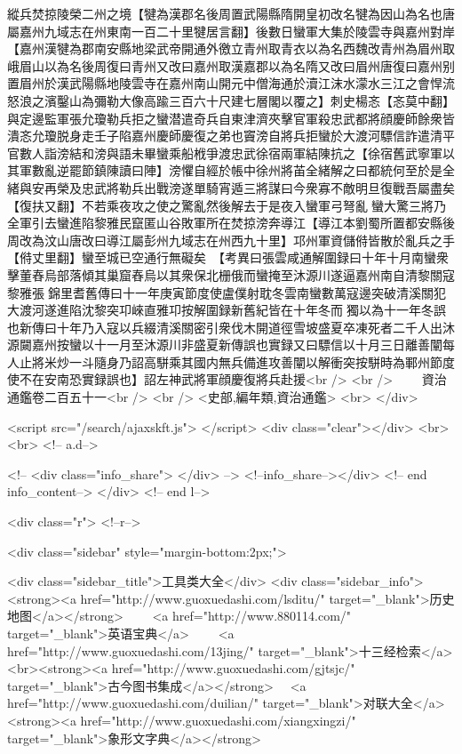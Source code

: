 縱兵焚掠陵榮二州之境【犍為漢郡名後周置武陽縣隋開皇初改名犍為因山為名也唐屬嘉州九域志在州東南一百二十里犍居言翻】後數日蠻軍大集於陵雲寺與嘉州對岸【嘉州漢犍為郡南安縣地梁武帝開通外徼立青州取青衣以為名西魏改青州為眉州取峨眉山以為名後周復曰青州又改曰嘉州取漢嘉郡以為名隋又改曰眉州唐復曰嘉州别置眉州於漢武陽縣地陵雲寺在嘉州南山開元中僧海通於瀆江沫水濛水三江之會悍流怒浪之濱鑿山為彌勒大像高踰三百六十尺建七層閣以覆之】刺史楊忞【忞莫中翻】與定邊監軍張允瓊勒兵拒之蠻潜遣奇兵自東津濟夾擊官軍殺忠武都將顔慶師餘衆皆潰忞允瓊脱身走壬子陷嘉州慶師慶復之弟也竇滂自將兵拒蠻於大渡河驃信詐遣清平官數人詣滂結和滂與語未畢蠻乘船栰爭渡忠武徐宿兩軍結陳抗之【徐宿舊武寧軍以其軍數亂逆罷節鎮陳讀曰陣】滂懼自經於帳中徐州將苖全緒解之曰都統何至於是全緒與安再榮及忠武將勒兵出戰滂遂單騎宵遁三將謀曰今衆寡不敵明旦復戰吾屬盡矣【復扶又翻】不若乘夜攻之使之驚亂然後解去于是夜入蠻軍弓弩亂蠻大驚三將乃全軍引去蠻進陷黎雅民竄匿山谷敗軍所在焚掠滂奔導江【導江本劉蜀所置都安縣後周改為汶山唐改曰導江屬彭州九域志在州西九十里】邛州軍資儲偫皆散於亂兵之手【偫丈里翻】蠻至城已空通行無礙矣　【考異曰張雲咸通解圍録曰十年十月南蠻衆擊董舂烏部落傾其巢窟舂烏以其衆保北栅俄而蠻掩至沐源川遂逼嘉州南自清黎關寇黎雅張錦里耆舊傳曰十一年庚寅節度使盧僕射耽冬雲南蠻數萬寇邊突破清溪關犯大渡河遂進陷沈黎突卭崍直雅卭按解圍録新舊紀皆在十年冬而獨以為十一年冬誤也新傳曰十年乃入寇以兵綴清溪關密引衆伐木開道徑雪坡盛夏卒凍死者二千人出沐源闚嘉州按蠻以十一月至沐源川非盛夏新傳誤也實録又曰驃信以十月三日離善闡每人止將米炒一斗隨身乃詔高駢乘其國内無兵備進攻善闡以解衝突按駢時為鄆州節度使不在安南恐實録誤也】詔左神武將軍顔慶復將兵赴援<br />
<br />
　　資治通鑑卷二百五十一<br />
<br />
<史部,編年類,資治通鑑>  <br>
   </div> 

<script src="/search/ajaxskft.js"> </script>
 <div class="clear"></div>
<br>
<br>
 <!-- a.d-->

 <!--
<div class="info_share">
</div> 
-->
 <!--info_share--></div>   <!-- end info_content-->
  </div> <!-- end l-->

<div class="r">   <!--r-->



<div class="sidebar"  style="margin-bottom:2px;">

 
<div class="sidebar_title">工具类大全</div>
<div class="sidebar_info">
<strong><a href="http://www.guoxuedashi.com/lsditu/" target="_blank">历史地图</a></strong>　　
<a href="http://www.880114.com/" target="_blank">英语宝典</a>　　
<a href="http://www.guoxuedashi.com/13jing/" target="_blank">十三经检索</a>　
<br><strong><a href="http://www.guoxuedashi.com/gjtsjc/" target="_blank">古今图书集成</a></strong>　
<a href="http://www.guoxuedashi.com/duilian/" target="_blank">对联大全</a>　<strong><a href="http://www.guoxuedashi.com/xiangxingzi/" target="_blank">象形文字典</a></strong>　

